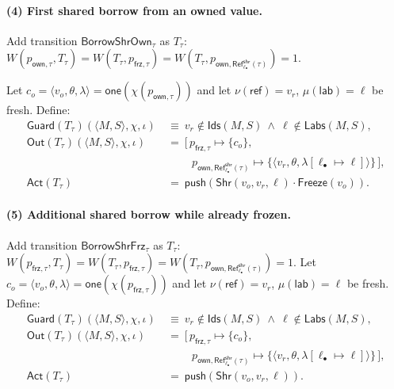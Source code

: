 \documentclass[runningheads]{llncs}
\begin{document}
\paragraph{(4) First shared borrow from an owned value.}
Add transition $\mathsf{BorrowShrOwn}_\tau$ as $T_\tau$: \\
$W(p_{\mathsf{own},\tau},T_\tau)=W(T_\tau,p_{\mathsf{frz},\tau})=
W(T_\tau,p_{\mathsf{own},\mathsf{Ref}^{\mathsf{shr}}_{\ell_{\bullet}}(\tau)})=1.$

Let $c_o=\langle v_o,\theta,\lambda\rangle=\mathsf{one}(\chi(p_{\mathsf{own},\tau}))$ and let
$\nu(\mathsf{ref})=v_r$, $\mu(\mathsf{lab})=\ell$ be fresh.
Define:
\begin{align*}
\mathsf{Guard}(T_\tau)(\langle M,S\rangle,\chi,\iota)
&~\equiv~ v_r\notin \mathsf{Ids}(M,S)\ \wedge\ \ell\notin \mathsf{Labs}(M,S),\\
\mathsf{Out}(T_\tau)(\langle M,S\rangle,\chi,\iota)
&~=~ [\,p_{\mathsf{frz},\tau}\mapsto \{c_o\},\\
&\qquad\ \ p_{\mathsf{own},\mathsf{Ref}^{\mathsf{shr}}_{\ell_{\bullet}}(\tau)}\mapsto
\{\langle v_r,\theta,\lambda[\ell_{\bullet}\mapsto \ell]\rangle\}\,],\\
\mathsf{Act}(T_\tau)
&~=~ \mathsf{push}(\mathsf{Shr}(v_o,v_r,\ell)\cdot \mathsf{Freeze}(v_o)).
\end{align*}

\paragraph{(5) Additional shared borrow while already frozen.}
Add transition $\mathsf{BorrowShrFrz}_\tau$ as $T_\tau$: \\
$W(p_{\mathsf{frz},\tau},T_\tau)=W(T_\tau,p_{\mathsf{frz},\tau})=
W(T_\tau,p_{\mathsf{own},\mathsf{Ref}^{\mathsf{shr}}_{\ell_{\bullet}}(\tau)})=1.$
Let $c_o=\langle v_o,\theta,\lambda\rangle=\mathsf{one}(\chi(p_{\mathsf{frz},\tau}))$ and let
$\nu(\mathsf{ref})=v_r$, $\mu(\mathsf{lab})=\ell$ be fresh.
Define:
\begin{align*}
\mathsf{Guard}(T_\tau)(\langle M,S\rangle,\chi,\iota)
&~\equiv~ v_r\notin \mathsf{Ids}(M,S)\ \wedge\ \ell\notin \mathsf{Labs}(M,S),\\
\mathsf{Out}(T_\tau)(\langle M,S\rangle,\chi,\iota)
&~=~ [\,p_{\mathsf{frz},\tau}\mapsto \{c_o\},\\
&\qquad\ \ p_{\mathsf{own},\mathsf{Ref}^{\mathsf{shr}}_{\ell_{\bullet}}(\tau)}\mapsto
\{\langle v_r,\theta,\lambda[\ell_{\bullet}\mapsto \ell]\rangle\}\,],\\
\mathsf{Act}(T_\tau)
&~=~ \mathsf{push}(\mathsf{Shr}(v_o,v_r,\ell)).
\end{align*}
\end{document}
